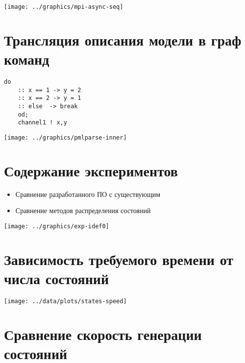 \documentclass[12pt]{article}
\begin{document}
\begin{center}
  \texttt{[image: ../graphics/mpi-async-seq]}
\end{center}

\section{Трансляция описания модели в граф команд}
\label{sec:pmlparse}

\begin{minipage}[m]{0.35\linewidth}
  \begin{lstlisting}[language=Promela,style=simplecode,numbers=none]
    do
    :: x == 1 -> y = 2
    :: x == 2 -> y = 1
    :: else  -> break
    od;
    channel1 ! x,y
  \end{lstlisting}
\end{minipage}
\begin{minipage}[m]{0.75\linewidth}
  \texttt{[image: ../graphics/pmlparse-inner]}
\end{minipage}

\section{Содержание экспериментов}
\label{sec:experim}

\begin{itemize}
\item Сравнение разработанного ПО с существующим
\item Сравнение методов распределения состояний
\end{itemize}

\begin{center}
  \texttt{[image: ../graphics/exp-idef0]}
\end{center}

\section{Зависимость требуемого времени от числа состояний}
\label{sec:states-time}

\begin{center}
  \texttt{[image: ../data/plots/states-speed]}
\end{center}

\section{Сравнение скорость генерации состояний}
\label{sec:stategen-speed}
\end{document}

